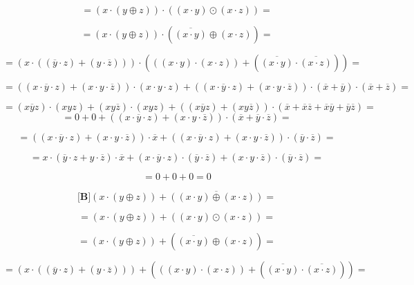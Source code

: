 \documentclass[
]{article}
\begin{document}
\begin{enumerate}
\begin{enumerate}
\begin{enumerate}
\begin{enumerate}
        \[{= {{({x \cdot {({y \oplus z})}})} \cdot {({{({x \cdot y})} \odot {({x \cdot z})}})}}} =\]

        \[{= {{({x \cdot {({y \oplus z})}})} \cdot {({\overline{({x\cdot y})} \oplus {({x \cdot z})}})}}} =\]

        \[{= {{({x \cdot {({{({\overline{y} \cdot z})} + {({y \cdot \overline{z}})}})}})} \cdot {({{({{({x \cdot y})} \cdot {({x \cdot z})}})} + {({\overline{({x\cdot y})} \cdot \overline{({x\cdot z})}})}})}}} =\]

        \[{= {{{({{({{x \cdot \overline{y}} \cdot z})} + {({{x \cdot y} \cdot \overline{z}})}})} \cdot {({{x \cdot y} \cdot z})}} + {{{({{({{x \cdot \overline{y}} \cdot z})} + {({{x \cdot y} \cdot \overline{z}})}})} \cdot {({\overline{x} + \overline{y}})}} \cdot {({\overline{x} + \overline{z}})}}}} =\]

        \[{= {{{{({x\overline{y}z})} \cdot {({xyz})}} + {{({xy\overline{z}})} \cdot {({xyz})}}} + {{({{({x\overline{y}z})} + {({xy\overline{z}})}})} \cdot {({{\overline{x} + \overline{x}}{\overline{z} + \overline{x}}{\overline{y} + \overline{y}}\overline{z}})}}}} =\]
        \[{= {{0 + 0} + {{({{({{x \cdot \overline{y}} \cdot z})} + {({{x \cdot y} \cdot \overline{z}})}})} \cdot {({\overline{x} + {\overline{y} \cdot \overline{z}}})}}}} =\]

        \[{= {{{({{({{x \cdot \overline{y}} \cdot z})} + {({{x \cdot y} \cdot \overline{z}})}})} \cdot \overline{x}} + {{({{({{x \cdot \overline{y}} \cdot z})} + {({{x \cdot y} \cdot \overline{z}})}})} \cdot {({\overline{y} \cdot \overline{z}})}}}} =\]

        \[{= {{{{x \cdot {({{\overline{y} \cdot z} + {y \cdot \overline{z}}})}} \cdot \overline{x}} + {{({{x \cdot \overline{y}} \cdot z})} \cdot {({\overline{y} \cdot \overline{z}})}}} + {{({{x \cdot y} \cdot \overline{z}})} \cdot {({\overline{y} \cdot \overline{z}})}}}} =\]

        \[{= {{0 + 0} + 0}} = 0\]

        \[{\lbrack\mathbf{B}\rbrack}{{{({x \cdot {({y \oplus z})}})} + \overline{({{({x\cdot y})}\oplus{({x\cdot z})}})}} =}\]

        \[{= {{({x \cdot {({y \oplus z})}})} + {({{({x \cdot y})} \odot {({x \cdot z})}})}}} =\]

        \[{= {{({x \cdot {({y \oplus z})}})} + {({\overline{({x\cdot y})} \oplus {({x \cdot z})}})}}} =\]

        \[{= {{({x \cdot {({{({\overline{y} \cdot z})} + {({y \cdot \overline{z}})}})}})} + {({{({{({x \cdot y})} \cdot {({x \cdot z})}})} + {({\overline{({x\cdot y})} \cdot \overline{({x\cdot z})}})}})}}} =\]


\end{enumerate}
\end{enumerate}
\end{enumerate}
\end{enumerate}
\end{document}
